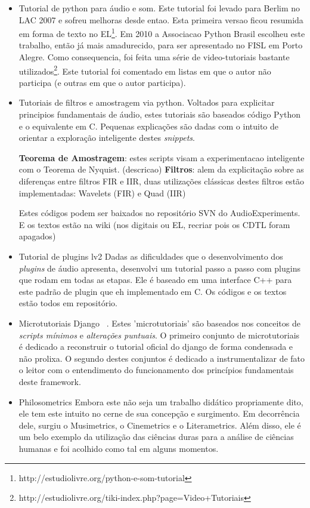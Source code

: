 \begin{itemize}
    \item Tutorial de python para áudio e som.
Este tutorial foi levado para Berlim no LAC 2007 e sofreu melhoras desde entao. Esta
primeira versao ficou resumida em forma de texto no EL\footnote{http://estudiolivre.org/python-e-som-tutorial}. Em 2010
a Associacao Python Brasil escolheu este trabalho, então já mais amadurecido, para ser apresentado no
FISL em Porto Alegre. Como consequencia, foi feita uma série de video-tutoriais bastante utilizados\footnote{http://estudiolivre.org/tiki-index.php?page=Video+Tutoriais}.
Este tutorial foi comentado em listas em que o autor não participa (e outras em que o autor participa).

    \item Tutoriais de filtros e amostragem via python.
Voltados para explicitar principios fundamentais de áudio, estes tutoriais
são baseados código Python e o equivalente em C. Pequenas explicações são
dadas com o intuito de orientar a exploração inteligente destes \emph{snippets}.

{\bf Teorema de Amostragem}: estes scripts visam a experimentacao inteligente com
o Teorema de Nyquist. (descricao)
{\bf Filtros}: alem da explicitação sobre as diferenças entre filtros FIR e IIR,
duas utilizações clássicas destes filtros estão implementadas: Wavelets (FIR) e Quad (IIR)

Estes códigos podem ser baixados no repositório SVN do AudioExperiments. E os textos estão
na wiki (nos digitais ou EL, recriar pois os CDTL foram apagados)

    \item Tutorial de plugins lv2
Dadas as dificuldades que o desenvolvimento dos \emph{plugins} de áudio apresenta,
desenvolvi um tutorial passo a passo com plugins que rodam em todas as etapas.
Ele é baseado em uma interface C++ para este padrão de plugin que eh implementado
em C. Os códigos e os textos estão todos em repositório.

    \item Microtutoriais Django ~\cite{dmicrotuts}.
Estes 'microtutoriais' são baseados nos conceitos de \emph{scripts mínimos} e
\emph{alterações puntuais}. O primeiro conjunto de microtutoriais é dedicado
a reconstruir o tutorial oficial do django de forma condensada e não prolixa.
O segundo destes conjuntos é dedicado a instrumentalizar de fato o leitor com
o entendimento do funcionamento dos princípios fundamentais deste framework.

    \item Philosometrics
Embora este não seja um trabalho didático propriamente dito, ele tem este intuito
no cerne de sua concepção e surgimento. Em decorrência dele, surgiu o  Musimetrics,
o Cinemetrics e o Literametrics. Além disso, ele é um belo exemplo da
utilização das ciências duras para a análise de ciências humanas e foi acolhido
como tal em alguns momentos.


\end{itemize}
